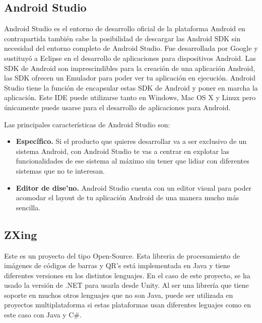 \subsection{Android Studio}
\label{cap2:subsec:androidstudio}

Android Studio es el entorno de desarrollo oficial de la plataforma Android en contrapartida tambi\'en cabe la posibilidad de descargar las Android SDK sin necesidad del entorno completo de Android Studio. Fue desarrollada por Google y sustituy\'o a Eclipse en el desarrollo de aplicaciones para dispositivos Android. Las SDK de Android son imprescindibles para la creaci\'on de una aplicaci\'on Android, las SDK ofrecen un Emulador para poder ver tu aplicaci\'on en ejecuci\'on. Android Studio tiene la funci\'on de encapsular estas SDK de Android y poner en marcha la aplicaci\'on. Este IDE puede utilizarse tanto en Windows, Mac OS X y Linux pero \'unicamente puede usarse para el desarrollo de aplicaciones para Android.


Las principales caracter\'isticas de Android Studio son:

\begin{itemize}

\item \textbf{Espec\'ifico.} Si el producto que quieres desarrollar va a ser exclusivo de un sistema Android, con Android Studio te vas a centrar en explotar las funcionalidades de ese sistema al m\'aximo sin tener que lidiar con diferentes sistemas que no te interesan.
\item \textbf{Editor de dise'no.} Android Studio cuenta con un editor visual para poder acomodar el layout de tu aplicaci\'on Android de una manera mucho m\'as sencilla.

\end{itemize}
\subsection{ZXing}
\label{cap2:subsec:zxing}

Este es un proyecto del tipo Open-Source. Esta libreria de procesamiento de im\'agenes de c\'odigos de barras y QR's est\'a implementada en Java y tiene diferentes versiones en los distintos lenguajes. En el caso de este proyecto, se ha usado la versi\'on de .NET para usarla desde Unity. Al ser una librer\'ia que tiene soporte en muchos otros lenguajes que no son Java, puede ser utilizada en proyectos multiplataforma si estas plataformas usan diferentes leguajes como en este caso con Java y C\#.


